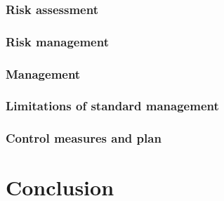 \documentclass[12pt,a4paper]{article}
\begin{document}
\subsubsection{Risk assessment}

\subsubsection{Risk management}

\subsubsection{Management}

\subsubsection{Limitations of standard management}

\subsubsection{Control measures and plan}

\section{Conclusion}





\end{document}
